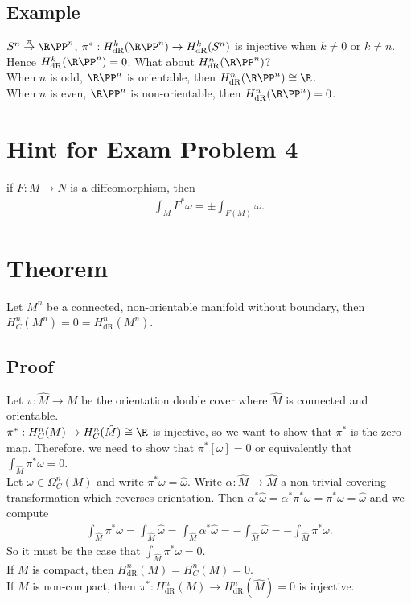 \documentclass[11pt]{article}
\begin{document}
\subsection*{Example}
\label{sec:orga09c7ed}
\(S^{n}\overset{\pi}{\to}\R\PP^{n}\), \(\pi^{*}:H^{k}_{\text{dR}}(\R\PP^{n})\to H^{k}_{\text{dR}}(S^{n})\) is injective when \(k\neq 0\) or \(k\neq n\).\\
Hence \(H^{k}_{\text{dR}}(\R\PP^{n})=0\). What about \(H^{n}_{\text{dR}}(\R\PP^{n})\)?\\
When \(n\) is odd, \(\R\PP^{n}\) is orientable, then \(H^{n}_{\text{dR}}(\R\PP^{n})\cong\R\).\\
When \(n\) is even, \(\R\PP^{n}\) is non-orientable, then \(H^{n}_{\text{dR}}(\R\PP^{n})=0\).\\
\section*{Hint for Exam Problem 4}
\label{sec:orga50c3ec}
if \(F:M\to N\) is a diffeomorphism, then\\
\begin{align*}
  \int_{M}F^{*}\omega
  =\pm\int_{F(M)}\omega.
\end{align*}
\section*{Theorem}
\label{sec:orgbc8beee}
Let \(M^{n}\) be a connected, non-orientable manifold without boundary, then \(H^{n}_{C}(M^{n})=0=H^{n}_{\text{dR}}(M^{n})\).\\
\subsection*{Proof}
\label{sec:orgde538f0}
Let \(\pi:\hat{M}\to M\) be the orientation double cover where \(\hat{M}\) is connected and orientable.\\
\(\pi^{*}:H^{n}_{C}(M)\to H^{n}_{C}(\hat{M})\cong\R\) is injective, so we want to show that \(\pi^{*}\) is the zero map. Therefore, we need to show that \(\pi^{*}[\omega]=0\) or equivalently that \(\int_{\hat{M}}\pi^{*}\omega=0\).\\
Let \(\omega\in\Omega^{n}_{C}(M)\) and write \(\pi^{*}\omega=\hat{\omega}\). Write \(\alpha:\hat{M}\to\hat{M}\) a non-trivial covering transformation which reverses orientation. Then \(\alpha^{*}\hat{\omega}=\alpha^{*}\pi^{*}\omega=\pi^{*}\omega=\hat{\omega}\) and we compute\\
\begin{align*}
  \int_{\hat{M}}\pi^{*}\omega
  =\int_{\hat{M}}\hat{\omega}
  =\int_{\hat{M}}\alpha^{*}\hat{\omega}
  =-\int_{\hat{M}}\hat{\omega}
  =-\int_{\hat{M}}\pi^{*}\omega.
\end{align*}
So it must be the case that \(\int_{\hat{M}}\pi^{*}\omega=0\).\\
If \(M\) is compact, then \(H^{n}_{\text{dR}}(M)=H^{n}_{C}(M)=0\).\\
If \(M\) is non-compact, then \(\pi^{*}:H^{n}_{\text{dR}}(M)\to H^{n}_{\text{dR}}(\hat{M})=0\) is injective.\\
\end{document}
